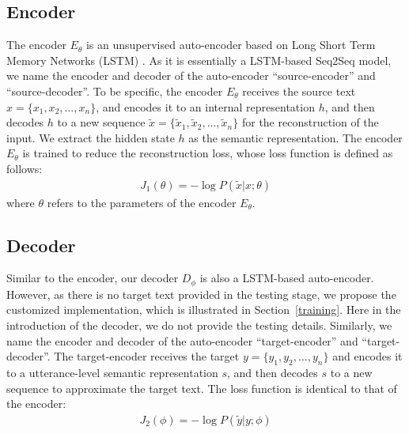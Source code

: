 \documentclass[11pt,a4paper]{article}
\begin{document}
\begin{CJK}{UTF8}{song}
\subsection{Encoder}\label{encoder}
The encoder $E_{\theta}$ is an unsupervised auto-encoder based on Long Short Term Memory Networks (LSTM) \citep{lstm}. As it is essentially a LSTM-based Seq2Seq model, we name the encoder and decoder of the auto-encoder ``source-encoder'' and ``source-decoder''. To be specific, the encoder $E_{\theta}$ receives the source text $x=\{x_1, x_2, ..., x_n\}$, and encodes it to an internal representation $h$, and then decodes $h$ to a new sequence $\tilde{x}=\{\tilde{x}_1, \tilde{x}_2, ..., \tilde{x}_n\}$ for the reconstruction of the input. We extract the hidden state $h$ as the semantic representation. The encoder $E_{\theta}$ is trained to reduce the reconstruction loss, whose loss function is defined as follows:
\begin{equation}
\begin{split}
J_1(\theta) =  -\log P(\tilde{x} |x; \theta)
\end{split}
\end{equation}
where $\theta$ refers to the parameters of the encoder $E_{\theta}$.




\subsection{Decoder}\label{decoder}
Similar to the encoder, our decoder $D_{\phi}$ is also a LSTM-based auto-encoder. However, as there is no target text provided in the testing stage, we propose the customized implementation, which is illustrated in Section~\ref{training}. Here in the introduction of the decoder, we do not provide the testing details. Similarly, we name the encoder and decoder of the auto-encoder ``target-encoder'' and ``target-decoder''. The target-encoder receives the target $y=\{y_1, y_2, ..., y_n\}$ and encodes it to a utterance-level semantic representation $s$, and then decodes $s$ to a new sequence to approximate the target text. The loss function is identical to that of the encoder:
\begin{equation}\label{learning-2}
\begin{split}
J_2(\phi) =  -\log P(\tilde{y} |y; \phi)
\end{split}
\end{equation}



\end{CJK}
\end{document}
